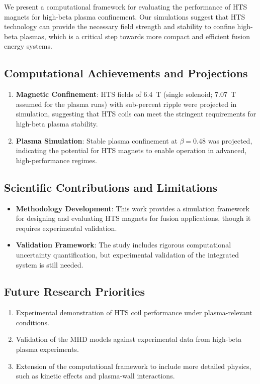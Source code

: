 \documentclass[10pt,twocolumn]{article}
\begin{document}
We present a computational framework for evaluating the performance of HTS magnets for high-beta plasma confinement. Our simulations suggest that HTS technology can provide the necessary field strength and stability to confine high-beta plasmas, which is a critical step towards more compact and efficient fusion energy systems.

\subsection{Computational Achievements and Projections}
\begin{enumerate}
\item \textbf{Magnetic Confinement}: HTS fields of 6.4~T (single solenoid; 7.07~T assumed for the plasma runs) with sub-percent ripple were projected in simulation, suggesting that HTS coils can meet the stringent requirements for high-beta plasma stability.
\item \textbf{Plasma Simulation}: Stable plasma confinement at $\beta=0.48$ was projected, indicating the potential for HTS magnets to enable operation in advanced, high-performance regimes.
\end{enumerate}

\subsection{Scientific Contributions and Limitations}
\begin{itemize}
\item \textbf{Methodology Development}: This work provides a simulation framework for designing and evaluating HTS magnets for fusion applications, though it requires experimental validation.
\item \textbf{Validation Framework}: The study includes rigorous computational uncertainty quantification, but experimental validation of the integrated system is still needed.
\end{itemize}

\subsection{Future Research Priorities}
\begin{enumerate}
\item Experimental demonstration of HTS coil performance under plasma-relevant conditions.
\item Validation of the MHD models against experimental data from high-beta plasma experiments.
\item Extension of the computational framework to include more detailed physics, such as kinetic effects and plasma-wall interactions.
\end{enumerate}
\end{document}
